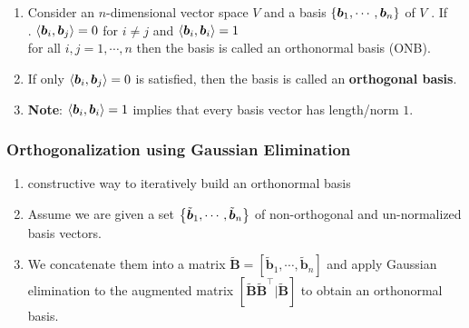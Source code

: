 \begin{enumerate}
    \item
    \begin{definition}
        Consider an $n$-dimensional vector space $V$ and a basis $\left\{\bm{b}_1, \cdots , \bm{b}_n\right\}$ of $V$ .
        If
        \hfill \cite{mfml/book/mml/Deisenroth-Faisal-Ong}
        \\
        .\hfill
        $\langle\bm{b}_i, \bm{b}_j\rangle = 0$ for $i \neq j$ and $\langle\bm{b}_i, \bm{b}_i\rangle = 1$
        \hfill \cite{mfml/book/mml/Deisenroth-Faisal-Ong}
        \\
        for all $i, j = 1, \cdots , n$ then the basis is called an orthonormal basis (ONB).
        \hfill \cite{mfml/book/mml/Deisenroth-Faisal-Ong}
    \end{definition}

    \item If only $\langle\bm{b}_i, \bm{b}_j\rangle = 0$ is satisfied, then the basis is called an \textbf{orthogonal basis}.
    \hfill \cite{mfml/book/mml/Deisenroth-Faisal-Ong}

    \item \textbf{Note}: $\langle\bm{b}_i, \bm{b}_i\rangle = 1$ implies that every basis vector has length/norm $1$.
    \hfill \cite{mfml/book/mml/Deisenroth-Faisal-Ong}

\end{enumerate}

\subsubsection{Orthogonalization using Gaussian Elimination}

\begin{enumerate}
    \item constructive way to iteratively build an orthonormal basis
    \hfill \cite{mfml/book/mml/Deisenroth-Faisal-Ong}

    \item Assume we are given a set $\left\{\tilde{\bm{b}}_1, \cdots ,\tilde{\bm{b}}_n\right\}$ of non-orthogonal and un-normalized basis vectors.
    \hfill \cite{mfml/book/mml/Deisenroth-Faisal-Ong}

    \item We concatenate them into a matrix $\tilde{\bm{B}} = [\tilde{\bm{b}}_1, \cdots ,\tilde{\bm{b}}_n]$ and apply Gaussian elimination to the augmented matrix $[\tilde{\bm{B}} \tilde{\bm{B}}^\top|\tilde{\bm{B}}]$ to obtain an orthonormal basis.
    \hfill \cite{mfml/book/mml/Deisenroth-Faisal-Ong}
\end{enumerate}


